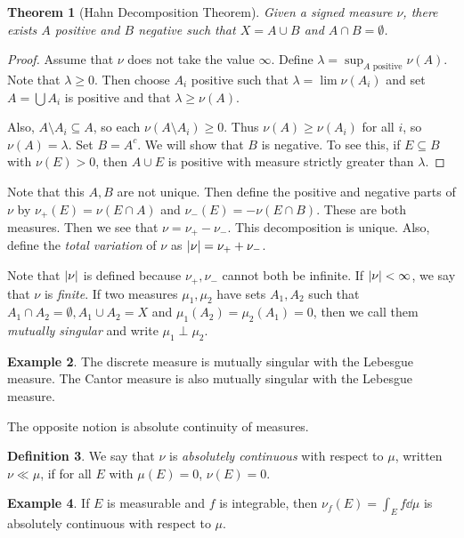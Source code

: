 \documentclass[leqno, openany]{memoir}
\newtheorem{thm}{Theorem}[chapter]
\theoremstyle{definition}
\newtheorem{defn}[thm]{Definition}
\newtheorem{exm}[thm]{Example}
\theoremstyle{remark}
\theoremstyle{plain}
\theoremstyle{definition}
\theoremstyle{remark}
\begin{document}
\begin{thm}[Hahn Decomposition Theorem]
    Given a signed measure $\nu$, there exists $A$ positive and $B$ negative such that $X = A \cup B$ and $A \cap B = \emptyset$.
\end{thm}

\begin{proof}
    Assume that $\nu$ does not take the value $\infty$. Define $\lambda = \sup_{A \text{ positive}} \nu(A)$. Note that $\lambda \geq 0$. Then choose $A_i$ positive such that $\lambda = \lim \nu(A_i)$ and set $A = \bigcup A_i$ is positive and that $\lambda \geq \nu(A)$.

    Also, $A \setminus A_i \subseteq A$, so each $\nu(A \setminus A_i) \geq 0$. Thus $\nu(A) \geq \nu(A_i)$ for all $i$, so $\nu(A) = \lambda$. Set $B = A^c$. We will show that $B$ is negative. To see this, if $E \subseteq B$ with $\nu(E) > 0$, then $A \cup E$ is positive with measure strictly greater than $\lambda$.
\end{proof}

Note that this $A,B$ are not unique. Then define the positive and negative parts of $\nu$ by $\nu_+(E) = \nu(E \cap A)$ and $\nu_-(E) = - \nu(E \cap B)$. These are both measures. Then we see that $\nu = \nu_+ - \nu_-$. This decomposition is unique. Also, define the \textit{total variation} of $\nu$ as $\abs{\nu} = \nu_+ + \nu_-$.

Note that $\abs{\nu}$ is defined because $\nu_+, \nu_-$ cannot both be infinite. If $\abs{\nu} < \infty$, we say that $\nu$ is \textit{finite}. If two measures $\mu_1, \mu_2$ have sets $A_1, A_2$ such that $A_1 \cap A_2 = \emptyset, A_1 \cup A_2 = X$ and $\mu_1(A_2) = \mu_2(A_1) = 0$, then we call them \textit{mutually singular} and write $\mu_1 \perp \mu_2$.

\begin{exm}
    The discrete measure is mutually singular with the Lebesgue measure. The Cantor measure is also mutually singular with the Lebesgue measure.
\end{exm}

The opposite notion is absolute continuity of measures.
\begin{defn}
    We say that $\nu$ is \textit{absolutely continuous} with respect to $\mu$, written $\nu \ll \mu$, if for all $E$ with $\mu(E) = 0$, $\nu(E) = 0$.
\end{defn}

\begin{exm}
    If $E$ is measurable and $f$ is integrable, then $\nu_f(E) = \int_E f \dd{\mu}$ is absolutely continuous with respect to $\mu$.
\end{exm}
\end{document}
